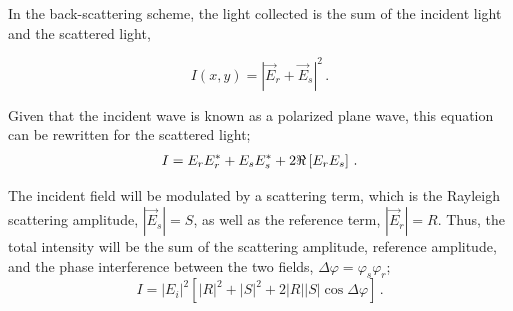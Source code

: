 
In the back-scattering scheme, the light collected is the sum of the incident light and the scattered light,

\begin{equation}
    I(x,y) = |\vec E_r + \vec E_s|^2\,.
\end{equation}

Given that the incident wave is known as a polarized plane wave, this equation can be rewritten for the scattered light;
\begin{equation}
    \begin{aligned}
        I = E_rE_r^* + E_sE_s^* + 2\real\left[E_rE_s\right]\,. \\
    \end{aligned}
\end{equation}

The incident field will be modulated by a scattering term, which is the Rayleigh scattering amplitude, $|\vec{E}_s| = S$, as well as the reference term, $|\vec{E}_r| = R$. Thus, the total intensity will be the sum of the scattering amplitude, reference amplitude, and the phase interference between the two fields, $\Delta \varphi = \varphi_s \varphi_r$; 
\begin{equation}
    I = |E_i|^2\left[|R|^2 + |S|^2 + 2|R||S|\cos \Delta \varphi\right]\,.
\end{equation}


